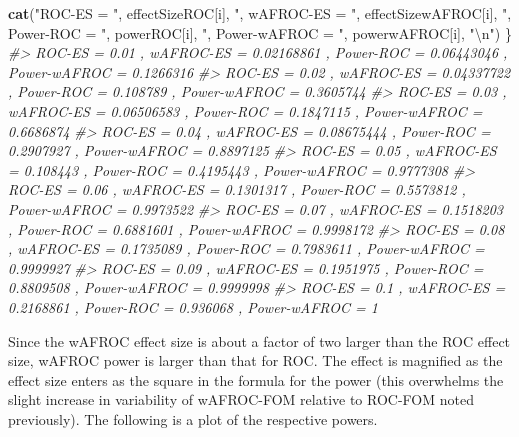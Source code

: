 \documentclass[]{book}
\newenvironment{Shaded}{\begin{snugshade}}{\end{snugshade}}
\newcommand{\CharTok}[1]{\textcolor[rgb]{0.31,0.60,0.02}{#1}}
\newcommand{\CommentTok}[1]{\textcolor[rgb]{0.56,0.35,0.01}{\textit{#1}}}
\newcommand{\KeywordTok}[1]{\textcolor[rgb]{0.13,0.29,0.53}{\textbf{#1}}}
\newcommand{\NormalTok}[1]{#1}
\newcommand{\StringTok}[1]{\textcolor[rgb]{0.31,0.60,0.02}{#1}}
\begin{document}
\begin{Shaded}
\begin{Highlighting}[]
  \KeywordTok{cat}\NormalTok{(}\StringTok{"ROC-ES = "}\NormalTok{, effectSizeROC[i], }\StringTok{", wAFROC-ES = "}\NormalTok{, effectSizewAFROC[i], }
      \StringTok{", Power-ROC = "}\NormalTok{, powerROC[i], }\StringTok{", Power-wAFROC = "}\NormalTok{, powerwAFROC[i], }\StringTok{"}\CharTok{\textbackslash{}n}\StringTok{"}\NormalTok{)}
\NormalTok{\}}
\CommentTok{#> ROC-ES =  0.01 , wAFROC-ES =  0.02168861 , Power-ROC =  0.06443046 , Power-wAFROC =  0.1266316 }
\CommentTok{#> ROC-ES =  0.02 , wAFROC-ES =  0.04337722 , Power-ROC =  0.108789 , Power-wAFROC =  0.3605744 }
\CommentTok{#> ROC-ES =  0.03 , wAFROC-ES =  0.06506583 , Power-ROC =  0.1847115 , Power-wAFROC =  0.6686874 }
\CommentTok{#> ROC-ES =  0.04 , wAFROC-ES =  0.08675444 , Power-ROC =  0.2907927 , Power-wAFROC =  0.8897125 }
\CommentTok{#> ROC-ES =  0.05 , wAFROC-ES =  0.108443 , Power-ROC =  0.4195443 , Power-wAFROC =  0.9777308 }
\CommentTok{#> ROC-ES =  0.06 , wAFROC-ES =  0.1301317 , Power-ROC =  0.5573812 , Power-wAFROC =  0.9973522 }
\CommentTok{#> ROC-ES =  0.07 , wAFROC-ES =  0.1518203 , Power-ROC =  0.6881601 , Power-wAFROC =  0.9998172 }
\CommentTok{#> ROC-ES =  0.08 , wAFROC-ES =  0.1735089 , Power-ROC =  0.7983611 , Power-wAFROC =  0.9999927 }
\CommentTok{#> ROC-ES =  0.09 , wAFROC-ES =  0.1951975 , Power-ROC =  0.8809508 , Power-wAFROC =  0.9999998 }
\CommentTok{#> ROC-ES =  0.1 , wAFROC-ES =  0.2168861 , Power-ROC =  0.936068 , Power-wAFROC =  1}
\end{Highlighting}
\end{Shaded}

Since the wAFROC effect size is about a factor of two larger than the ROC effect size, wAFROC power is larger than that for ROC. The effect is magnified as the effect size enters as the square in the formula for the power (this overwhelms the slight increase in variability of wAFROC-FOM relative to ROC-FOM noted previously). The following is a plot of the respective powers.
\end{document}
